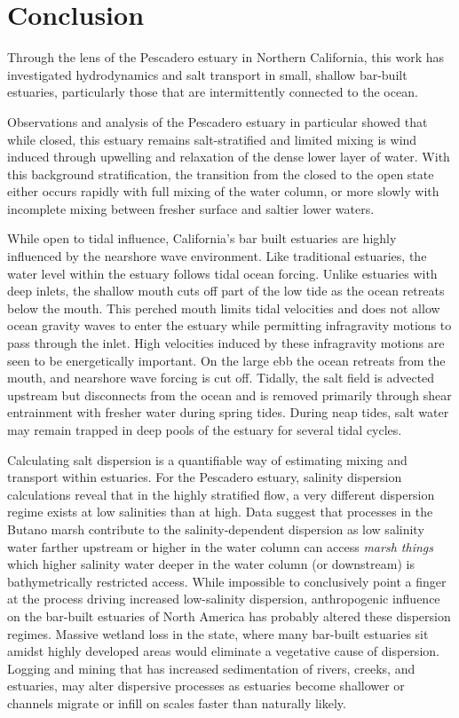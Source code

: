\chapter{Conclusion}
\label{conclusion}

Through the lens of the Pescadero estuary in Northern California, this work has investigated hydrodynamics and salt transport in small, shallow bar-built estuaries, particularly those that are intermittently connected to the ocean. 

Observations and analysis of the Pescadero estuary in particular showed that while closed, this estuary remains salt-stratified and limited mixing is wind induced through upwelling and relaxation of the dense lower layer of water. With this background stratification, the transition from the closed to the open state either occurs rapidly with full mixing of the water column, or more slowly with incomplete mixing between fresher surface and saltier lower waters. 

While open to tidal influence, California's bar built estuaries are highly influenced by the nearshore wave environment. Like traditional estuaries, the water level within the estuary follows tidal ocean forcing. Unlike estuaries with deep inlets, the shallow mouth cuts off part of the low tide as the ocean retreats below the mouth. This perched mouth limits tidal velocities and does not allow ocean gravity waves to enter the estuary while permitting infragravity motions to pass through the inlet. High velocities induced by these infragravity motions are seen to be energetically important. On the large ebb the ocean retreats from the mouth, and nearshore wave forcing is cut off. Tidally, the salt field is  advected upstream but disconnects from the ocean and is removed primarily through shear entrainment with fresher water during spring tides. During neap tides, salt water may remain trapped in deep pools of the estuary for several tidal cycles. 

Calculating salt dispersion is a quantifiable way of estimating mixing and transport within estuaries. For the Pescadero estuary, salinity dispersion calculations reveal that in the highly stratified flow, a very different dispersion regime exists at low salinities than at high. Data suggest that processes in the Butano marsh contribute to the salinity-dependent dispersion as low salinity water farther upstream or higher in the water column can access \emph{marsh things} which higher salinity water deeper in the water column (or downstream) is bathymetrically restricted access. While impossible to conclusively point a finger at the process driving increased low-salinity dispersion, anthropogenic influence on the bar-built estuaries of North America has probably altered these dispersion regimes. Massive wetland loss in the state, where many bar-built estuaries sit amidst highly developed areas would eliminate a vegetative cause of dispersion. Logging and mining that has increased sedimentation of rivers, creeks, and estuaries, may alter dispersive processes as estuaries become shallower or channels migrate or infill on scales faster than naturally likely.  

